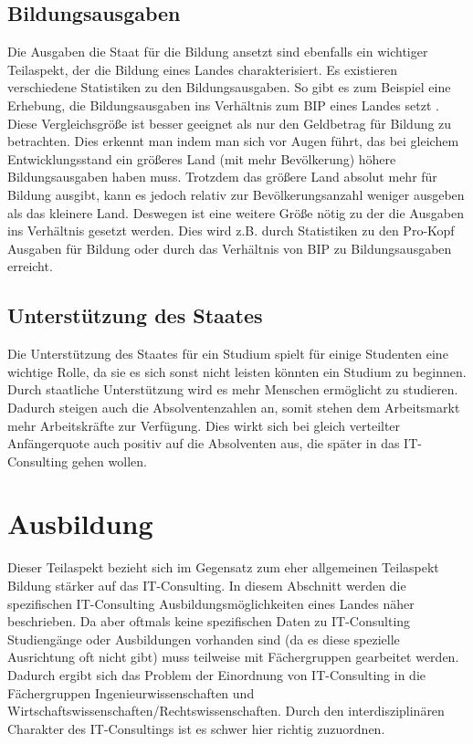 \subsection{Bildungsausgaben}
Die Ausgaben die Staat für die Bildung ansetzt sind ebenfalls ein wichtiger Teilaspekt, der die Bildung eines Landes charakterisiert.
Es existieren verschiedene Statistiken zu den Bildungsausgaben. So gibt es zum Beispiel eine Erhebung, die Bildungsausgaben ins Verhältnis zum BIP eines Landes setzt\cite[6]{oecd2} . Diese Vergleichsgröße ist besser geeignet als nur den Geldbetrag für Bildung zu betrachten. Dies erkennt man indem man sich vor Augen führt, das bei gleichem Entwicklungsstand ein größeres Land (mit mehr Bevölkerung) höhere Bildungsausgaben haben muss. Trotzdem das größere Land absolut mehr für Bildung ausgibt, kann es jedoch relativ zur Bevölkerungsanzahl weniger ausgeben als das kleinere Land. Deswegen ist eine weitere Größe nötig zu der die Ausgaben ins Verhältnis gesetzt werden. Dies wird z.B. durch Statistiken zu den Pro-Kopf Ausgaben für Bildung \cite[4]{oecd2} oder durch das Verhältnis von BIP zu Bildungsausgaben erreicht.

\subsection{Unterstützung des Staates} 
Die Unterstützung des Staates für ein Studium spielt für einige Studenten eine wichtige Rolle, da sie es sich sonst nicht leisten könnten ein Studium zu beginnen. Durch staatliche Unterstützung wird es mehr Menschen ermöglicht zu studieren. Dadurch steigen auch die Absolventenzahlen an, somit stehen dem Arbeitsmarkt mehr Arbeitskräfte zur Verfügung. Dies wirkt sich bei gleich verteilter Anfängerquote auch positiv auf die Absolventen aus, die später in das IT-Consulting gehen wollen.

 \section{Ausbildung}
Dieser Teilaspekt bezieht sich im Gegensatz zum eher allgemeinen Teilaspekt Bildung stärker auf das IT-Consulting. In diesem Abschnitt werden die spezifischen IT-Consulting Ausbildungsmöglichkeiten eines Landes näher beschrieben.
Da aber oftmals keine spezifischen Daten zu IT-Consulting Studiengänge oder Ausbildungen vorhanden sind (da es diese spezielle Ausrichtung oft nicht gibt) muss teilweise mit Fächergruppen gearbeitet werden.
Dadurch ergibt sich das Problem der Einordnung von IT-Consulting in die Fächergruppen Ingenieurwissenschaften und Wirtschaftswissenschaften/Rechtswissenschaften. Durch den interdisziplinären Charakter des IT-Consultings ist es schwer hier richtig zuzuordnen.

